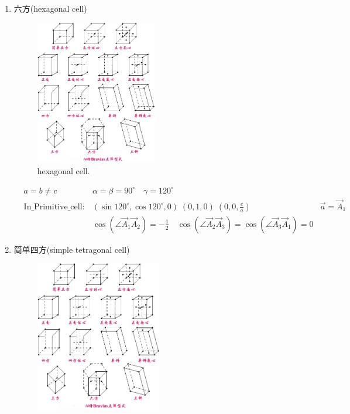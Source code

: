 \documentclass{article}      %
\begin{document}
\begin{enumerate}
		\item 六方(\textrm{hexagonal cell})
\begin{figure}[h!]
\centering
\includegraphics[width=0.5\textwidth,viewport=170 30 290 185,clip]{Bravias.jpg}
\caption{\small hexagonal cell.}%
\label{Bravais:hexagonal cell}
\end{figure}
\begin{displaymath}
	\begin{aligned}
		& a=b\neq c & \alpha=\beta=90^{\circ} \quad \gamma=120^{\circ}\\
		&\mathrm{In\_Primitive\_cell}:&(\sin120^{\circ},\cos120^{\circ},0)\;(0,1,0)\;(0,0,\frac{c}{a})\;\;\;\;&\vec a=\vec A_1\\
		& &\cos(\angle\vec A_1\vec A_2)=-\frac12\quad\cos(\angle\vec A_2\vec A_3)=\cos(\angle\vec A_3\vec A_1)=0
	\end{aligned}
\end{displaymath}
		\item 简单四方(\textrm{simple tetragonal cell})
\begin{figure}[h!]
\centering
\includegraphics[width=0.52\textwidth,viewport=-50 185 125 325,clip]{Bravias.jpg}

\end{figure}
\end{enumerate}
\end{document}
